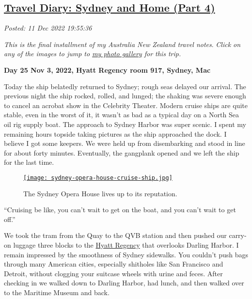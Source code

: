 %

\subsection*{\href{http://analyzethedatanotthedrivel.org/2022/12/11/travel-diary-sydney-and-home-part-4/}{Travel Diary: Sydney and Home (Part 4)}}


\noindent\emph{Posted: 11 Dec 2022 19:55:36}
\vspace{6pt}

\emph{This is the final installment of my Australia New Zealand travel
notes}. \emph{Click on any of the images to jump to
\href{https://conceptcontrol.smugmug.com/Trips/Overseas/Australia-New-Zealand-2022/}{my
photo gallery} for this trip.}


\textbf{Day 25 Nov 3, 2022, Hyatt Regency room 917, Sydney, Mac}

Today the ship belatedly returned to Sydney; rough seas delayed our
arrival. The previous night the ship rocked, rolled, and lunged; the
shaking was severe enough to cancel an acrobat show in the Celebrity
Theater. Modern cruise ships are quite stable, even in the worst of it,
it wasn't as bad as a typical day on a North Sea oil rig supply boat.
The approach to Sydney Harbor was super scenic. I spent my remaining
hours topside taking pictures as the ship approached the dock. I believe
I got some keepers. We were held up from disembarking and stood in line
for about forty minutes. Eventually, the gangplank opened and we left
the ship for the last time.


\captionsetup[figure]{labelformat=empty}
\begin{figure}[htbp]
\centering
\href{https://conceptcontrol.smugmug.com/Trips/Overseas/Australia-New-Zealand-2022/i-8DNHGRR/A}{\texttt{[image: sydney-opera-house-cruise-ship.jpg]}}
\caption{The Sydney Opera House lives up to its reputation.}
\label{fig:7627x0}
\end{figure}
 

``Cruising be like, you can't wait to get on the boat, and you can't
wait to get off.''

We took the tram from the Quay to the QVB station and then pushed our
carry-on luggage three blocks to the \href{https://www.hyatt.com/en-US/hotel/australia/hyatt-regency-sydney/sydrs}{Hyatt Regency} that overlooks
Darling Harbor. I remain impressed by the smoothness of Sydney
sidewalks. You couldn't push bags through many American cities,
especially shitholes like San Francisco and Detroit, without clogging
your suitcase wheels with urine and feces. After checking in we walked
down to Darling Harbor, had lunch, and then walked over to the Maritime
Museum and back.

